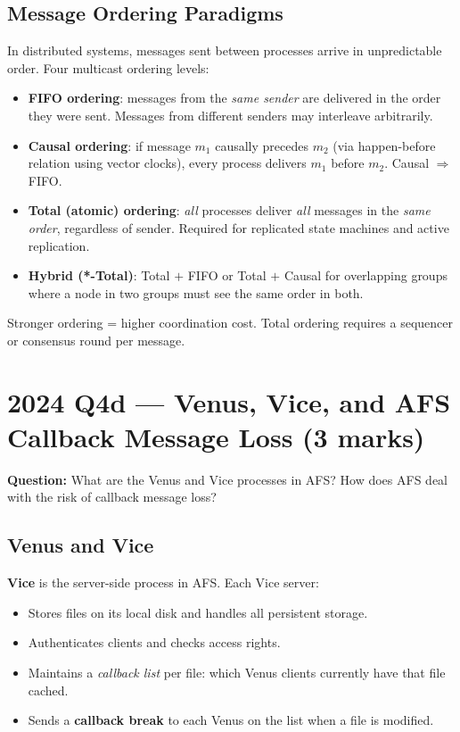 \documentclass[12pt,a4paper]{article}
\begin{document}
\subsection*{Message Ordering Paradigms}

In distributed systems, messages sent between processes arrive in unpredictable order. Four multicast ordering levels:
\begin{itemize}[noitemsep]
  \item \textbf{FIFO ordering}: messages from the \emph{same sender} are delivered in the order they were sent. Messages from different senders may interleave arbitrarily.
  \item \textbf{Causal ordering}: if message $m_1$ causally precedes $m_2$ (via happen-before relation using vector clocks), every process delivers $m_1$ before $m_2$. Causal $\Rightarrow$ FIFO.
  \item \textbf{Total (atomic) ordering}: \emph{all} processes deliver \emph{all} messages in the \emph{same order}, regardless of sender. Required for replicated state machines and active replication.
  \item \textbf{Hybrid (*-Total)}: Total $+$ FIFO or Total $+$ Causal for overlapping groups where a node in two groups must see the same order in both.
\end{itemize}
Stronger ordering = higher coordination cost. Total ordering requires a sequencer or consensus round per message.

\section{2024 Q4d --- Venus, Vice, and AFS Callback Message Loss (3 marks)}

\textbf{Question:} What are the Venus and Vice processes in AFS? How does AFS deal with the risk of callback message loss?

\subsection*{Venus and Vice}

\textbf{Vice} is the server-side process in AFS. Each Vice server:
\begin{itemize}[noitemsep]
  \item Stores files on its local disk and handles all persistent storage.
  \item Authenticates clients and checks access rights.
  \item Maintains a \emph{callback list} per file: which Venus clients currently have that file cached.
  \item Sends a \textbf{callback break} to each Venus on the list when a file is modified.
\end{itemize}
\end{document}
